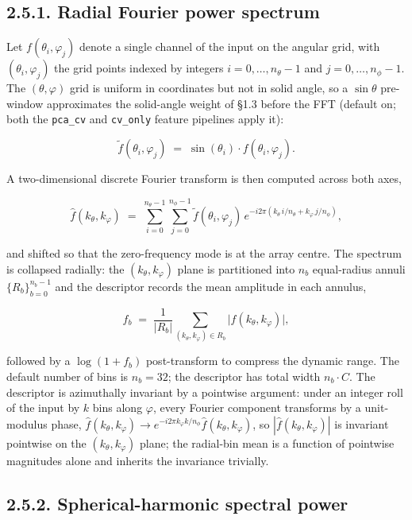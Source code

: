 \documentclass[
  english,
  11pt,
]{report}
\begin{document}
\subsection{2.5.1. Radial Fourier power
spectrum}\label{radial-fourier-power-spectrum}

Let \(f(\theta_i, \varphi_j)\) denote a single channel of the input on
the angular grid, with \((\theta_i, \varphi_j)\) the grid points indexed
by integers \(i = 0, \dots, n_\theta - 1\) and
\(j = 0, \dots, n_\phi - 1\). The \((\theta, \varphi)\) grid is uniform
in coordinates but not in solid angle, so a \(\sin\theta\) pre-window
approximates the solid-angle weight of §1.3 before the FFT (default on;
both the \texttt{pca\_cv} and \texttt{cv\_only} feature pipelines apply
it):

\[
\tilde f(\theta_i, \varphi_j)\;=\;\sin(\theta_i)\cdot f(\theta_i, \varphi_j).
\]

A two-dimensional discrete Fourier transform is then computed across
both axes,

\[
\hat f(k_\theta, k_\varphi)\;=\;\sum_{i = 0}^{n_\theta - 1}\sum_{j = 0}^{n_\phi - 1}\tilde f(\theta_i, \varphi_j)\,e^{-i 2\pi(k_\theta\,i / n_\theta + k_\varphi\,j / n_\phi)},
\]

and shifted so that the zero-frequency mode is at the array centre. The
spectrum is collapsed radially: the \((k_\theta, k_\varphi)\) plane is
partitioned into \(n_b\) equal-radius annuli \(\{R_b\}_{b=0}^{n_b-1}\)
and the descriptor records the mean amplitude in each annulus,

\[
f_b\;=\;\frac{1}{|R_b|}\sum_{(k_\theta, k_\varphi)\in R_b}\bigl|\hat f(k_\theta, k_\varphi)\bigr|,
\]

followed by a \(\log(1 + f_b)\) post-transform to compress the dynamic
range. The default number of bins is \(n_b = 32\); the descriptor has
total width \(n_b\cdot C\). The descriptor is azimuthally invariant by a
pointwise argument: under an integer roll of the input by \(k\) bins
along \(\varphi\), every Fourier component transforms by a unit-modulus
phase,
\(\hat f(k_\theta, k_\varphi)\to e^{-i 2\pi k_\varphi k/n_\phi}\hat f(k_\theta, k_\varphi)\),
so \(|\hat f(k_\theta, k_\varphi)|\) is invariant pointwise on the
\((k_\theta, k_\varphi)\) plane; the radial-bin mean is a function of
pointwise magnitudes alone and inherits the invariance trivially.

\subsection{2.5.2. Spherical-harmonic spectral
power}\label{spherical-harmonic-spectral-power}
\end{document}
